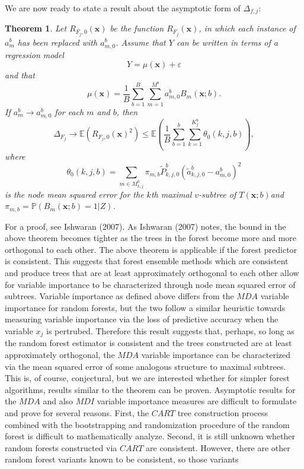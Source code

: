 \documentclass[12pt,twoside]{reedthesis}
\newtheorem{theorem}{Theorem}[chapter]
\theoremstyle{definition}
\theoremstyle{definition}
\theoremstyle{definition}
\theoremstyle{remark}
\begin{document}
We are now ready to state a result about the asymptotic form of
\(\Delta_{f,j}\):
\begin{theorem}
Let $R_{F_j, 0}(\mathbf{x})$ be the function $R_{F_j}(\mathbf{x})$, in which each instance of $a_m^b$ has been replaced with $a_{m,0}^b$. Assume that $Y$ can be written in terms of a regression model $$Y=\mu(\mathbf{x})+\varepsilon$$ and that $$\mu(\mathbf{x})=\frac{1}{B}\sum_{b=1}^B\sum_{m=1}^{M^b}a_{m,0}^b B_m(\mathbf{x};b).$$ If $a_m^b\rightarrow a_{m,0}^b$ for each $m$ and $b$, then $$\Delta_{F_j}\rightarrow \mathbb{E}\left(R_{F_j,0}(\mathbf{x})^2\right)\leq\mathbb{E}\left(\frac{1}{B}\sum_{b=1}^b\sum_{k=1}^{K_j^b}\theta_0(k,j,b)\right),$$ where $$\theta_0(k,j,b)=\sum_{m\in M_{k,j}^b} \pi_{m,b}\tilde{P}_{k,j,0}^b\left(\tilde{a}_{k,j,0}^b-a_{m,0}^b\right)^2$$ is the node mean squared error for the $k$th maximal $v$-subtree of $T(\mathbf{x};b)$and $\pi_{m,b}=\mathbb{P}(B_m(\mathbf{x};b)=1|Z)$. 
\end{theorem}
For a proof, see Ishwaran (2007). As Ishwaran (2007) notes, the bound in
the above theorem becomes tighter as the trees in the forest become more
and more orthogonal to each other. The above theorem is applicable if
the forest predictor is consistent. This suggests that forest ensemble
methods which are consistent and produce trees that are at least
approximately orthogonal to each other allow for variable importance to
be characterized through node mean squared error of subtrees. Variable
importance as defined above differs from the \(MDA\) variable importance
for random forests, but the two follow a similar heuristic towards
measuring variable importance via the loss of predictive accuracy when
the variable \(x_j\) is pertrubed. Therefore this result suggests that,
perhaps, so long as the random forest estimator is consistent and the
trees constructed are at least approximately orthogonal, the \(MDA\)
variable importance can be characterized via the mean squared error of
some analogous structure to maximal subtrees. This is, of course,
conjectural, but we are interested whether for simpler forest
algorithms, results similar to the theorem can be proven. Asymptotic
results for the \(MDA\) and also \(MDI\) variable importance measures
are difficult to formulate and prove for several reasons. First, the
\(CART\) tree construction process combined with the bootstrapping and
randomization procedure of the random forest is difficult to
mathematically analyze. Second, it is still unknown whether random
forests constructed via \(CART\) are consistent. However, there are
other random forest variants known to be consistent, so those variants
\end{document}
